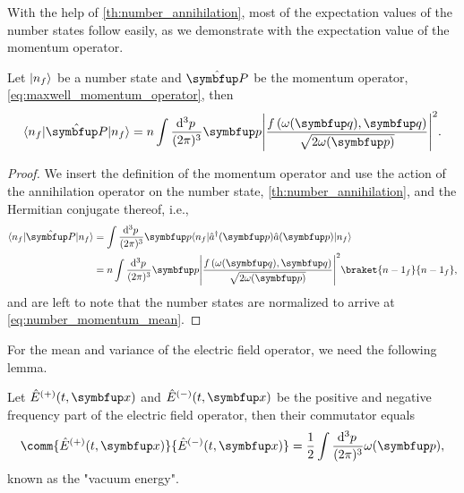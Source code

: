 With the help of \cref{th:number_annihilation}, most of the expectation values of the number states follow easily, as we demonstrate with the expectation value of the momentum operator.
\begin{theorem}
	Let $\lvert n_f\rangle$ be a number state and $\vu{P}$ be the momentum operator, \cref{eq:maxwell_momentum_operator}, then
	\begin{equation}
		\bra{n_f}
		\vu{P}
		\ket{n_f}
		=
		n
		\int\frac{\dd[3]{p}}{(2\pi)^3}
		\vb{p}
		\abs*{\frac{f\left(\omega(\vb{q}),\vb{q}\right)}{\sqrt{2\omega(\vb{p})}}}^2
		\label{eq:number_momentum_mean}
		.
	\end{equation}
\end{theorem}
\begin{proof}
	We insert the definition of the momentum operator and use the action of the annihilation operator on the number state, \cref{th:number_annihilation}, and the Hermitian conjugate thereof, i.e.,
	\begin{equation}
		\begin{split}
			\bra{n_f}
			\vu{P}
			\ket{n_f}
			&=
			\int\frac{\dd[3]{p}}{(2\pi)^3}
			\vb{p}
			\bra{n_f}
			\hat{a}^\dagger(\vb{p})
			\hat{a}(\vb{p})
			\ket{n_f}
			\\
			&=
			n
			\int\frac{\dd[3]{p}}{(2\pi)^3}
			\vb{p}
			\abs*{\frac{f\left(\omega(\vb{q}),\vb{q}\right)}{\sqrt{2\omega(\vb{p})}}}^2
			\braket{{n-1}_f}{{n-1}_f}
			,
		\end{split}
	\end{equation}
	and are left to note that the number states are normalized to arrive at \cref{eq:number_momentum_mean}.
\end{proof}
For the mean and variance of the electric field operator, we need the following lemma.
\begin{lemma}\label{th:comm_electric_field_equal}
	Let $\hat{E}^{(+)}(t,\vb{x})$ and $\hat{E}^{(-)}(t,\vb{x})$ be the positive and negative frequency part of the electric field operator, then their commutator equals
	\begin{equation}
		\comm{\hat{E}^{(+)}(t,\vb{x})}{\hat{E}^{(-)}(t,\vb{x})}
		=
		\frac{1}{2}
		\int\frac{\dd[3]{p}}{(2\pi)^3}
		\omega(\vb{p})
		,
	\end{equation}
	known as the "vacuum energy".
\end{lemma}
